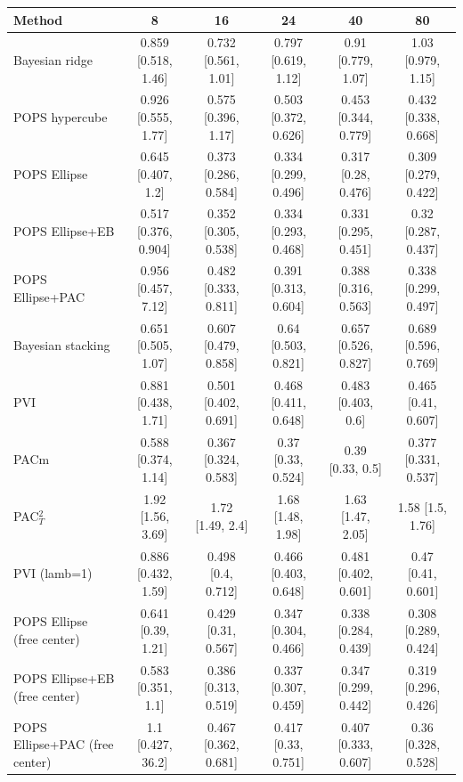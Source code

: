 \begin{tabular}{lccccc}
\toprule
Method & 8 & 16 & 24 & 40 & 80 \\
\midrule
Bayesian ridge & 0.859 {\scriptsize[0.518, 1.46]} & 0.732 {\scriptsize[0.561, 1.01]} & 0.797 {\scriptsize[0.619, 1.12]} & 0.91 {\scriptsize[0.779, 1.07]} & 1.03 {\scriptsize[0.979, 1.15]} \\
POPS hypercube & 0.926 {\scriptsize[0.555, 1.77]} & 0.575 {\scriptsize[0.396, 1.17]} & 0.503 {\scriptsize[0.372, 0.626]} & 0.453 {\scriptsize[0.344, 0.779]} & 0.432 {\scriptsize[0.338, 0.668]} \\
POPS Ellipse & 0.645 {\scriptsize[0.407, 1.2]} & 0.373 {\scriptsize[0.286, 0.584]} & 0.334 {\scriptsize[0.299, 0.496]} & 0.317 {\scriptsize[0.28, 0.476]} & 0.309 {\scriptsize[0.279, 0.422]} \\
POPS Ellipse+EB & 0.517 {\scriptsize[0.376, 0.904]} & 0.352 {\scriptsize[0.305, 0.538]} & 0.334 {\scriptsize[0.293, 0.468]} & 0.331 {\scriptsize[0.295, 0.451]} & 0.32 {\scriptsize[0.287, 0.437]} \\
POPS Ellipse+PAC & 0.956 {\scriptsize[0.457, 7.12]} & 0.482 {\scriptsize[0.333, 0.811]} & 0.391 {\scriptsize[0.313, 0.604]} & 0.388 {\scriptsize[0.316, 0.563]} & 0.338 {\scriptsize[0.299, 0.497]} \\
Bayesian stacking & 0.651 {\scriptsize[0.505, 1.07]} & 0.607 {\scriptsize[0.479, 0.858]} & 0.64 {\scriptsize[0.503, 0.821]} & 0.657 {\scriptsize[0.526, 0.827]} & 0.689 {\scriptsize[0.596, 0.769]} \\
PVI & 0.881 {\scriptsize[0.438, 1.71]} & 0.501 {\scriptsize[0.402, 0.691]} & 0.468 {\scriptsize[0.411, 0.648]} & 0.483 {\scriptsize[0.403, 0.6]} & 0.465 {\scriptsize[0.41, 0.607]} \\
PACm & 0.588 {\scriptsize[0.374, 1.14]} & 0.367 {\scriptsize[0.324, 0.583]} & 0.37 {\scriptsize[0.33, 0.524]} & 0.39 {\scriptsize[0.33, 0.5]} & 0.377 {\scriptsize[0.331, 0.537]} \\
PAC$^2_T$ & 1.92 {\scriptsize[1.56, 3.69]} & 1.72 {\scriptsize[1.49, 2.4]} & 1.68 {\scriptsize[1.48, 1.98]} & 1.63 {\scriptsize[1.47, 2.05]} & 1.58 {\scriptsize[1.5, 1.76]} \\
PVI (lamb=1) & 0.886 {\scriptsize[0.432, 1.59]} & 0.498 {\scriptsize[0.4, 0.712]} & 0.466 {\scriptsize[0.403, 0.648]} & 0.481 {\scriptsize[0.402, 0.601]} & 0.47 {\scriptsize[0.41, 0.601]} \\
POPS Ellipse (free center) & 0.641 {\scriptsize[0.39, 1.21]} & 0.429 {\scriptsize[0.31, 0.567]} & 0.347 {\scriptsize[0.304, 0.466]} & 0.338 {\scriptsize[0.284, 0.439]} & 0.308 {\scriptsize[0.289, 0.424]} \\
POPS Ellipse+EB (free center) & 0.583 {\scriptsize[0.351, 1.1]} & 0.386 {\scriptsize[0.313, 0.519]} & 0.337 {\scriptsize[0.307, 0.459]} & 0.347 {\scriptsize[0.299, 0.442]} & 0.319 {\scriptsize[0.296, 0.426]} \\
POPS Ellipse+PAC (free center) & 1.1 {\scriptsize[0.427, 36.2]} & 0.467 {\scriptsize[0.362, 0.681]} & 0.417 {\scriptsize[0.33, 0.751]} & 0.407 {\scriptsize[0.333, 0.607]} & 0.36 {\scriptsize[0.328, 0.528]} \\
\bottomrule
\end{tabular}

